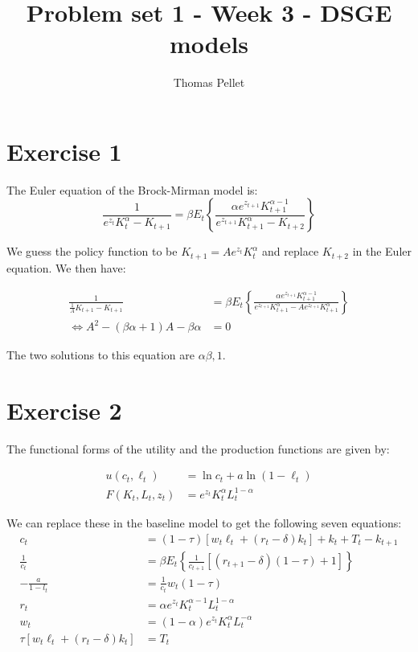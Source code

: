 \documentclass[11pt]{article}
\title{Problem set 1 - Week 3 - DSGE models}
\author{Thomas Pellet}
\numberwithin{equation}{section}
\theoremstyle{plain}
\theoremstyle{definition}
\def\bic{\Leftrightarrow}
\newcommand{\1}{\mathbbm 1}
\def\a{\alpha}
\def\b{\beta}
\begin{document}
\maketitle



\section*{Exercise 1}

The Euler equation of the Brock-Mirman model is:
\begin{equation}
\frac{1}{e^{z_{t}} K_{t}^{\alpha}-K_{t+1}}=\beta E_{t}\left\{\frac{\alpha e^{z_{t+1}} K_{t+1}^{\alpha-1}}{e^{z_{t+1}} K_{t+1}^{\alpha}-K_{t+2}}\right\}
\end{equation}

We guess the policy function to be $ K_{t+1}=A e^{z_{t}} K_{t}^{\alpha} $ and replace $K_{t+2}$ in the Euler equation. We then have:

\begin{align}
\frac{1}{\frac{1}{A}K_{t+1}-K_{t+1}}&=\beta E_{t}\left\{\frac{\alpha e^{z_{t+1}} K_{t+1}^{\alpha-1}}{e^{z_{t+1}} K_{t+1}^{\alpha}-A e^{z_{t+1}} K_{t+1}^{\alpha}}\right\} \\
\bic A^2 - (\b \a + 1) A - \b \a &= 0
\end{align}

The two solutions to this equation are ${\a \b, 1}$.

\section*{Exercise 2}

The functional forms of the utility and the production functions are given by:

\begin{align} 
u\left(c_{t}, \ell_{t}\right) &=\ln c_{t}+a \ln \left(1-\ell_{t}\right) \\ 
F\left(K_{t}, L_{t}, z_{t}\right) &=e^{z_{t}} K_{t}^{\alpha} L_{t}^{1-\alpha} 
\end{align}

We can replace these in the baseline model to get the following seven equations:
\begin{align}
c_{t}&=(1-\tau)\left[w_{t} \ell_{t}+\left(r_{t}-\delta\right) k_{t}\right]+k_{t}+T_{t}-k_{t+1} \\
\frac{1}{c_t}&=\beta E_{t}\left\{\frac{1}{c_{t+1}}\left[\left(r_{t+1}-\delta\right)(1-\tau)+1\right]\right\} \\
-\frac{a}{1-l_t}&=\frac{1}{c_t} w_{t}(1-\tau) \\
r_{t}&=\a e^{z_{t}} K_{t}^{\alpha-1} L_{t}^{1-\alpha} \\
w_{t}&=(1 - \a) e^{z_{t}} K_{t}^{\alpha} L_{t}^{-\alpha} \\
\tau\left[w_{t} \ell_{t}+\left(r_{t}-\delta\right) k_{t}\right]&=T_{t}
\end{align}
\end{document}
